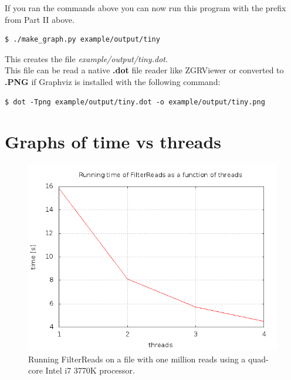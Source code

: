 \documentclass[a4paper]{report}
\renewcommand{\b}[1]{\textbf{#1}}  %
\newcommand{\e}[1]{\emph{#1}}    %
\begin{document}
If you ran the commands above you can now run this program with the prefix from Part II above.
\begin{verbatim}
$ ./make_graph.py example/output/tiny
\end{verbatim}

This creates the file \e{example/output/tiny.dot}.\\[4pt]

This file can be read a native \b{.dot} file reader like ZGRViewer\cite{zgr} or converted to \b{.PNG} if Graphviz is installed with the following command:
\begin{verbatim}
$ dot -Tpng example/output/tiny.dot -o example/output/tiny.png
\end{verbatim}

\newpage
\section{Graphs of time vs threads}

\begin{figure}[h!]
\centering\includegraphics[scale=0.6]{graphs/threadtime_filter1.png}
\caption{Running FilterReads on a file with one million reads using a quad-core Intel i7 3770K processor.}
\label{filtertime1}
\end{figure}
\end{document}
